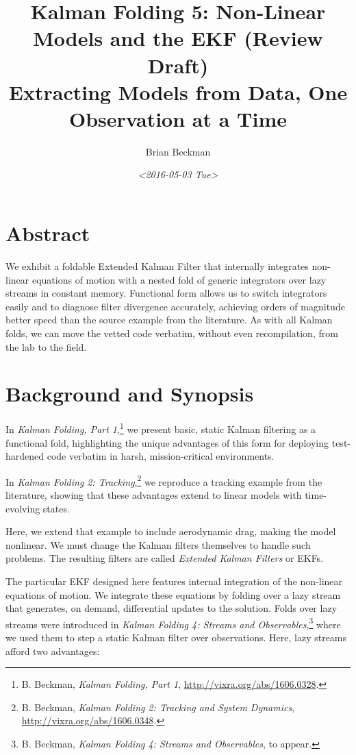 \documentclass[10pt,oneside,x11names]{article}
\author{Brian Beckman}
\date{\textit{<2016-05-03 Tue>}}
\title{Kalman Folding 5: Non-Linear Models and the EKF (Review Draft)\\\medskip
\large Extracting Models from Data, One Observation at a Time}
\begin{document}
\maketitle
\setcounter{tocdepth}{2}
\tableofcontents


\section{Abstract}
\label{sec:orgheadline1}

We exhibit a foldable Extended Kalman Filter that internally integrates
non-linear equations of motion with a nested fold of generic
integrators over lazy streams in constant memory.
Functional form allows us to switch integrators easily and to diagnose filter
divergence accurately, achieving orders of magnitude better speed than
the source example from the literature. As with all Kalman folds, we can move
the vetted code verbatim, without even recompilation, from the lab to the field.

\section{Background and Synopsis}
\label{sec:orgheadline2}

In \emph{Kalman Folding, Part 1},\footnote{B. Beckman, \emph{Kalman Folding, Part 1}, \url{http://vixra.org/abs/1606.0328}.} we present basic, static Kalman filtering
as a functional fold, highlighting the unique advantages of this form for
deploying test-hardened code verbatim in harsh, mission-critical environments.

In \emph{Kalman Folding 2: Tracking},\footnote{B. Beckman, \emph{Kalman Folding 2: Tracking and System Dynamics}, \url{http://vixra.org/abs/1606.0348}.} we reproduce a tracking example from
the literature, showing that these advantages extend to linear
models with time-evolving states. 

Here, we extend that example to include aerodynamic drag, making the model
nonlinear. We must change the Kalman filters themselves to handle such problems.
The resulting filters are called \emph{Extended Kalman Filters} or EKFs.

The particular EKF designed here features internal integration of the non-linear
equations of motion. We integrate these equations by folding over a lazy stream
that generates, on demand, differential updates to the solution. Folds over lazy
streams were introduced in \emph{Kalman Folding 4: Streams and Observables},\footnote{B. Beckman, \emph{Kalman Folding 4: Streams and Observables}, to appear.}
where we used them to step a static Kalman filter over observations. Here,
lazy streams afford two advantages:
\end{document}
